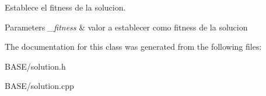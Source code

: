 Establece el fitness de la solucion. 


\begin{DoxyParams}{Parameters}
{\em \+\_\+fitness} & valor a establecer como fitness de la solucion \\
\hline
\end{DoxyParams}


The documentation for this class was generated from the following files\+:\begin{DoxyCompactItemize}
\item 
B\+A\+S\+E/solution.\+h\item 
B\+A\+S\+E/solution.\+cpp\end{DoxyCompactItemize}
